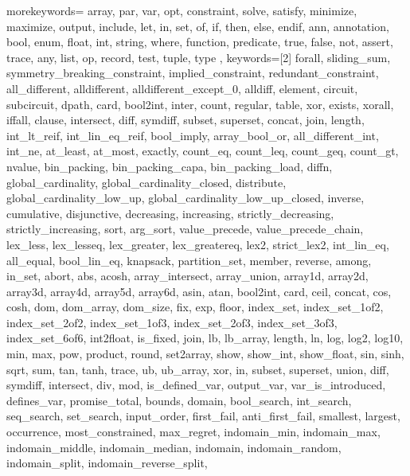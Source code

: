 \usepackage{listings}
\usepackage{courier} %

\newcommand\mznfont{\fontfamily{pcr}\selectfont}

{
  morekeywords={
  array, par, var, opt, constraint, solve, satisfy, minimize,
  maximize, output, include, let, in, set, of, if, then, else, endif,
  ann, annotation, bool, enum, float, int, string, where, function,
  predicate, true, false, not, assert, trace,
  any, list, op, record, test, tuple, type
  },
  keywords=[2]{
  forall, sliding_sum, symmetry_breaking_constraint,
  implied_constraint, redundant_constraint, all_different,
  alldifferent, alldifferent_except_0, alldiff, element, circuit,
  subcircuit, dpath, card, bool2int, inter, count, regular, table, xor,
  exists, xorall, iffall, clause, intersect, diff, symdiff, subset,
  superset, concat, join, length, int_lt_reif, int_lin_eq_reif,
  bool_imply, array_bool_or, all_different_int, int_ne, at_least,
  at_most, exactly, count_eq, count_leq, count_geq, count_gt, nvalue,
  bin_packing, bin_packing_capa, bin_packing_load, diffn,
  global_cardinality, global_cardinality_closed, distribute,
  global_cardinality_low_up, global_cardinality_low_up_closed,
  inverse, cumulative, disjunctive, decreasing, increasing,
  strictly_decreasing, strictly_increasing, sort,
  arg_sort, value_precede, value_precede_chain, lex_less, lex_lesseq,
  lex_greater, lex_greatereq, lex2, strict_lex2, int_lin_eq, all_equal,
  bool_lin_eq, knapsack, partition_set, member, reverse, among, in_set,
  abort, abs, acosh, array_intersect, array_union, array1d, array2d,
  array3d, array4d, array5d, array6d, asin, atan, bool2int, card,
  ceil, concat, cos, cosh, dom, dom_array, dom_size, fix, exp, floor,
  index_set, index_set_1of2, index_set_2of2, index_set_1of3,
  index_set_2of3, index_set_3of3, index_set_6of6, int2float, is_fixed,
  join, lb, lb_array, length, ln, log, log2, log10, min, max, pow,
  product, round, set2array, show, show_int, show_float, sin, sinh,
  sqrt, sum, tan, tanh, trace, ub, ub_array, xor, in, subset,
  superset, union, diff, symdiff, intersect, div, mod,
  is_defined_var, output_var, var_is_introduced, defines_var,
  promise_total, bounds, domain, bool_search, int_search, seq_search,
  set_search, input_order, first_fail, anti_first_fail, smallest,
  largest, occurrence, most_constrained, max_regret, indomain_min,
  indomain_max, indomain_middle, indomain_median, indomain,
  indomain_random, indomain_split, indomain_reverse_split,
}}
